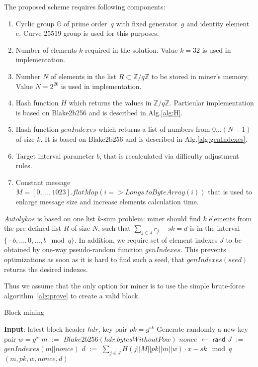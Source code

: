 \documentclass[]{article}
\newcommand{\Name}{$Autolykos$}
\def\Let#1#2{\State #1 $:=$ #2}
\def\LetRnd#1#2{\State #1 $\gets$ #2}
\begin{document}
    The proposed scheme requires following components:
    \begin{enumerate}
        \item Cyclic group $\mathbb{G}$ of prime order~$q$ with fixed generator~$g$
        and identity element~$e$.
        Curve 25519 group is used for this purposes.
        \item Number of elements $k$ required in the solution. Value $k=32$ is used in
            implementation.
        \item Number $N$ of elements in the list
            $R\subset\mathbb{Z}/q\mathbb{Z}$ to be stored in miner's memory.
            Value $N=2^{26}$ is used in implementation.
        \item Hash function $H$ which returns the values in $\mathbb{Z}/q\mathbb{Z}$.
        Particular implementation is based on Blake2b256 and is described in Alg.\ref{alg:H}.
        \item Hash function $genIndexes$ which returns a list of numbers from
            $0\dots(N-1)$ of size $k$.
        It is based on Blake2b256 and is described in Alg.\ref{alg:genIndexes}.
        \item Target interval parameter $b$, that is recalculated via difficulty adjustment rules.
        \item Constant message $M=[0,\dots,1023].flatMap(i => Longs.toByteArray(i))$ that is used to enlarge message size and increase elements calculation time.
    \end{enumerate}

    \Name{} is based on one list $k$-sum problem: miner should find
    $k$ elements from the pre-defined list $R$ of size $N$, such that
    $\sum_{j \in J} r_{j} - sk = d$ is in the interval $\{-b,\dots,0,\dots,b\mod q\}$.
    In addition, we require set of element indexes $J$ to be obtained
    by one-way pseudo-random function $genIndexes$. This prevents optimizations as
    soon as it is hard to find such a seed,
    that $genIndexes(seed)$ returns the desired indexes.

    Thus we assume that the only option for miner is to use the simple brute-force algorithm~\ref{alg:prove} to
    create a valid block.

    \begin{algorithm}[H]
        \caption{Block mining}
        \label{alg:prove}
        \begin{algorithmic}[1]
            \State \textbf{Input}: latest block header $hdr$, key pair $pk=g^{sk}$
            \State Generate randomly a new key pair $w=g^x$
            \Let{$m$}{$Blake2b256(hdr.bytesWithoutPow)$}
            \LetRnd{$nonce$}{$\mathsf{rand}$}
            \Let{$J$}{$genIndexes(m||nonce)$}
            \Let{$d$}{$\sum_{j \in J}{H(j||M||pk||m||w)} \cdot x - sk \mod q$}
            \State \Return $(m,pk,w,nonce,d)$
            \EndIf
            \EndWhile
        \end{algorithmic}
    \end{algorithm}
\end{document}
